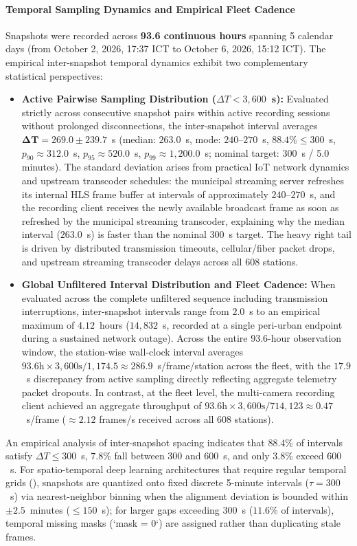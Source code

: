 \documentclass[preprint,12pt]{elsarticle}
\begin{document}
\paragraph{Temporal Sampling Dynamics and Empirical Fleet Cadence}
Snapshots were recorded across \textbf{93.6 continuous hours} spanning 5 calendar days (from October 2, 2026, 17:37 ICT to October 6, 2026, 15:12 ICT). The empirical inter-snapshot temporal dynamics exhibit two complementary statistical perspectives:
\begin{itemize}
    \item \textbf{Active Pairwise Sampling Distribution ($\Delta T < 3,600$~s):} Evaluated strictly across consecutive snapshot pairs within active recording sessions without prolonged disconnections, the inter-snapshot interval averages $\mathbf{\Delta T = 269.0 \pm 239.7}$~s (median: $263.0$~s, mode: $240$--$270$~s, $88.4\% \le 300$~s, $p_{90} \approx 312.0$~s, $p_{95} \approx 520.0$~s, $p_{99} \approx 1,200.0$~s; nominal target: $300$~s / 5.0 minutes). The standard deviation arises from practical IoT network dynamics and upstream transcoder schedules: the municipal streaming server refreshes its internal HLS frame buffer at intervals of approximately $240$--$270$~s, and the recording client receives the newly available broadcast frame as soon as refreshed by the municipal streaming transcoder, explaining why the median interval ($263.0$~s) is faster than the nominal $300$~s target. The heavy right tail is driven by distributed transmission timeouts, cellular/fiber packet drops, and upstream streaming transcoder delays across all 608 stations.
    \item \textbf{Global Unfiltered Interval Distribution and Fleet Cadence:} When evaluated across the complete unfiltered sequence including transmission interruptions, inter-snapshot intervals range from $2.0$~s to an empirical maximum of $4.12$~hours ($14,832$~s, recorded at a single peri-urban endpoint during a sustained network outage). Across the entire 93.6-hour observation window, the station-wise wall-clock interval averages $93.6\text{h} \times 3,600\text{s} / 1,174.5 \approx \mathbf{286.9}$~s/frame/station across the fleet, with the $17.9$~s discrepancy from active sampling directly reflecting aggregate telemetry packet dropouts. In contrast, at the fleet level, the multi-camera recording client achieved an aggregate throughput of $93.6\text{h} \times 3,600\text{s} / 714,123 \approx \mathbf{0.47}$~s/frame ($\approx 2.12$ frames/s received across all 608 stations).
\end{itemize}
An empirical analysis of inter-snapshot spacing indicates that $\mathbf{88.4\%}$ of intervals satisfy $\Delta T \le 300$~s, $\mathbf{7.8\%}$ fall between $300$ and $600$~s, and only $\mathbf{3.8\%}$ exceed $600$~s. For spatio-temporal deep learning architectures that require regular temporal grids (), snapshots are quantized onto fixed discrete 5-minute intervals ($\tau = 300$~s) via nearest-neighbor binning when the alignment deviation is bounded within $\pm 2.5$~minutes ($\le 150$~s); for larger gaps exceeding $300$~s ($11.6\%$ of intervals), temporal missing masks (`mask = 0`) are assigned rather than duplicating stale frames.
\end{document}
